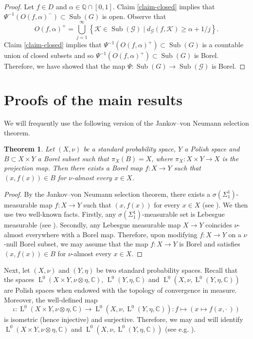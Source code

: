 \documentclass[11pt]{amsart}
\numberwithin{equation}{section}
\theoremstyle{plain}
\newtheorem{thm}{Theorem}[section]
\theoremstyle{definition}
\newcommand{\C}{\mathbb{C}}
\newcommand{\Sub}{\operatorname{Sub}}
\newcommand{\rL}{\operatorname{L}}
\begin{document}
\begin{proof}
Let $f \in D$ and $\alpha \in \mathbb Q \cap [0, 1]$. Claim \ref{claim-closed} implies that $\Psi^{-1}(O(f, \alpha)^-) \subset \Sub(G)$ is open. Observe that 
$$O(f, \alpha)^+ = \bigcup_{j = 1}^\infty  \left \{\mathscr K \in \Sub(\mathscr G) \mid d_{\mathscr G}(f, \mathscr K) \geq \alpha + 1/j \right \}.$$
Claim \ref{claim-closed} implies that $\Psi^{-1}(O(f, \alpha)^+) \subset \Sub(G)$ is a countable union of closed subsets and so $\Psi^{-1}(O(f, \alpha)^+) \subset \Sub(G)$ is Borel. Therefore, we have showed that the map $\Psi : \Sub(G) \to \Sub(\mathscr G) $ is Borel.
\end{proof}



\section{Proofs of the main results}

We will frequently use the following version of the Jankov--von Neumann selection theorem.

\begin{thm}\label{thm-selection}
Let $(X, \nu)$ be a standard probability space, $Y$ a Polish space and $B \subset X \times Y$ a Borel subset such that $\pi_X(B) = X$, where $\pi_X : X \times Y \to X$ is the projection map. Then there exists a Borel map $f : X \to Y$ such that $(x, f(x)) \in B$ for $\nu$-almost every $x \in X$.
\end{thm}

\begin{proof}
By the Jankov--von Neumann selection theorem, there exists a $\sigma(\Sigma_1^1)$-measurable map $f : X \to Y$ such that $(x, f(x))$ for every $x \in X$ (see \cite[Theorem 18.1]{Ke95}). We then use two well-known facts. Firstly, any $\sigma(\Sigma_1^1)$-measurable set is Lebesgue measurable (see \cite[Theorem 29.7]{Ke95}). Secondly, any Lebesgue measurable map $X \to Y$ coincides $\nu$-almost everywhere with a Borel map. Therefore, upon modifying $f : X \to Y$ on a $\nu$-null Borel subset, we may assume that the map $f : X \to Y$ is Borel and satisfies $(x, f(x)) \in B$ for $\nu$-almost every $x \in X$.
\end{proof}


Next, let $(X, \nu)$ and $(Y, \eta)$ be two standard probability spaces. Recall that the spaces $\rL^0(X \times Y, \nu \otimes \eta, \C)$, $\rL^0(Y, \eta, \C)$ and $\rL^0(X, \nu, \rL^0(Y, \eta, \C))$ are Polish spaces when endowed with the topology of convergence in measure. Moreover, the well-defined map 
$$\iota : \rL^0(X \times Y, \nu \otimes \eta, \mathbb C) \to \rL^0(X, \nu, \rL^0(Y, \eta, \C)) : f \mapsto (x \mapsto f(x, \cdot \,))$$
is isometric (hence injective) and surjective. Therefore, we may and will identify $\rL^0(X \times Y, \nu \otimes \eta, \mathbb C)$ and $\rL^0(X, \nu, \rL^0(Y, \eta, \C))$ (see e.g.\! \cite[Theorem 1]{Mo75}).
\end{document}
